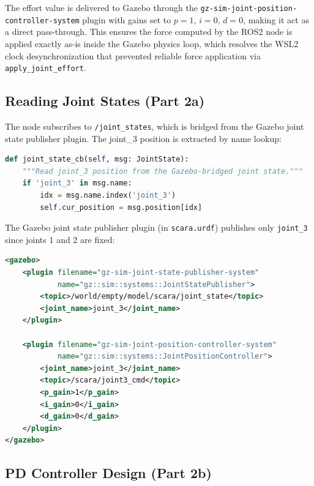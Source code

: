 \documentclass[12pt]{article}
\begin{document}
The effort value is delivered to Gazebo through the
\texttt{gz-sim-joint-position-controller-system} plugin with gains set to
$p=1$, $i=0$, $d=0$, making it act as a direct pass-through. This ensures
the force computed by the ROS2 node is applied exactly as-is inside the
Gazebo physics loop, which resolves the WSL2 clock desynchronization that
prevented reliable force application via \texttt{apply\_joint\_effort}.

\subsection{Reading Joint States (Part 2a)}

The node subscribes to \texttt{/joint\_states}, which is bridged from the
Gazebo joint state publisher plugin. The joint\_3 position is extracted by
name lookup:

\begin{lstlisting}[style=ros, language=Python,
    caption={Joint state subscriber callback}]
def joint_state_cb(self, msg: JointState):
    """Read joint_3 position from the Gazebo-bridged joint state."""
    if 'joint_3' in msg.name:
        idx = msg.name.index('joint_3')
        self.cur_position = msg.position[idx]
\end{lstlisting}

The Gazebo joint state publisher plugin (in \texttt{scara.urdf}) publishes
only \texttt{joint\_3} since joints 1 and 2 are fixed:

\begin{lstlisting}[style=ros, language=XML,
    caption={Gazebo joint state publisher plugin (URDF)}]
<gazebo>
    <plugin filename="gz-sim-joint-state-publisher-system"
            name="gz::sim::systems::JointStatePublisher">
        <topic>/world/empty/model/scara/joint_state</topic>
        <joint_name>joint_3</joint_name>
    </plugin>

    <plugin filename="gz-sim-joint-position-controller-system"
            name="gz::sim::systems::JointPositionController">
        <joint_name>joint_3</joint_name>
        <topic>/scara/joint3_cmd</topic>
        <p_gain>1</p_gain>
        <i_gain>0</i_gain>
        <d_gain>0</d_gain>
    </plugin>
</gazebo>
\end{lstlisting}

\subsection{PD Controller Design (Part 2b)}
\end{document}
